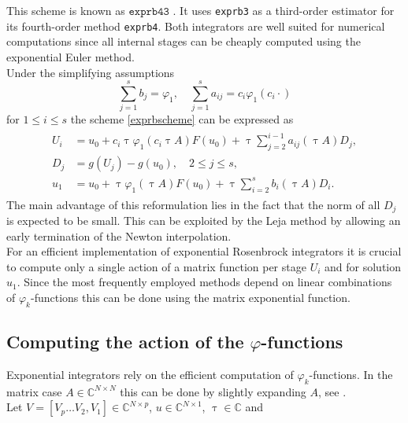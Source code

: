 \documentclass{scrartcl}
\begin{document}
\noindent This scheme is known as $\texttt{exprb43}$ \cite[Example 2.24]{bible}. It uses \texttt{exprb3} as a third-order estimator for its fourth-order method \texttt{exprb4}. Both integrators are well suited for numerical computations since all internal stages can be cheaply computed using the exponential Euler method. \\
Under the simplifying assumptions
\[
	\sum_{j=1}^s b_j = \varphi_1, \quad  \sum_{j=1}^s a_{ij} = c_i\varphi_1(c_i\cdot) 
\]
for $1\le i\le s$ the scheme \ref{exprbscheme} can be expressed as 
\begin{align}
\begin{split}
	U_i &= u_0 + c_i\uptau\varphi_1(c_i \uptau A)F(u_0) + \uptau\sum_{j=2}^{i-1}a_{ij}(\uptau A)D_j, \\
	D_j &= g(U_j) - g(u_0), \quad 2\le j\le s, \\
	u_1 &= u_0 +    \uptau\varphi_1(    \uptau A)F(u_0) + \uptau\sum_{i=2}^{s}     b_i(\uptau A)D_i.
\end{split}\label{Djscheme}
\end{align}
The main advantage of this reformulation lies in the fact that the norm of all $D_j$ is expected to be small. This can be exploited by the Leja method by allowing an early termination of the Newton interpolation. \\
For an efficient implementation of exponential Rosenbrock integrators it is crucial to compute only a single action of a matrix function per stage $U_i$ and for solution $u_1$. Since the most frequently employed methods depend on linear combinations of $\varphi_k$-functions this can be done using the matrix exponential function.

\subsection{Computing the action of the $\varphi$-functions}
Exponential integrators rely on the efficient computation of $\varphi_k$-functions. In the matrix case $A\in\mathbb{C}^{N\times N}$ this can be done by slightly expanding $A$, see \cite[Theorem 2.1]{action}.\\
Let $V = [V_p\dots V_2, V_1]\in\mathbb{C}^{N\times p}$, $u\in\mathbb{C}^{N\times 1}$, $\uptau\in\mathbb{C}$ and
\end{document}
